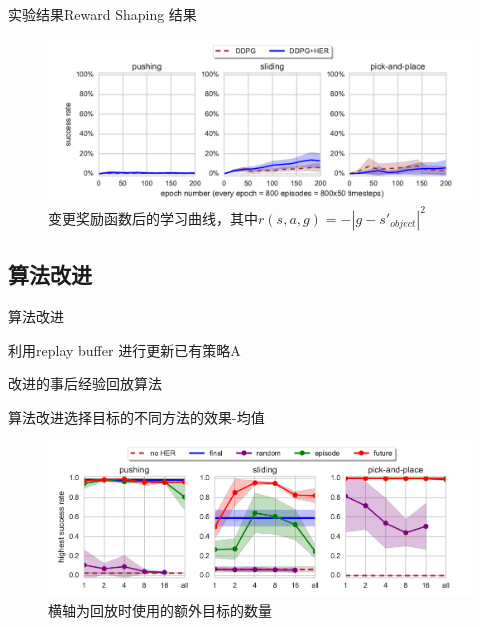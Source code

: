 \documentclass[10pt]{beamer}
\begin{document}
	\begin{frame}{实验结果}{Reward Shaping 结果}
		\begin{figure}
			\centering
			\includegraphics[width=0.7\linewidth]{pictures/reward-shape-expr}
			\caption{变更奖励函数后的学习曲线，其中$r(s,a,g) = -|g-s'_{object}|^2$}
			\label{fig:reward-shape-expr}
		\end{figure}
		
	\end{frame}

	\subsection{算法改进}

	\begin{frame}{算法改进}
		\begin{algorithm}[H]
			
			利用replay buffer 进行更新已有策略A\;
			\caption{改进的事后经验回放算法}\label{alg:adv-her}
		\end{algorithm}
	\end{frame}

	\begin{frame}{算法改进}{选择目标的不同方法的效果-均值}
		\begin{figure}
			\centering
			\includegraphics[width=0.9\linewidth]{pictures/her-with-additional-goals}
			\caption{横轴为回放时使用的额外目标的数量}
			\label{fig:her-with-additional-goals}
		\end{figure}
		
	\end{frame}
\end{document}
